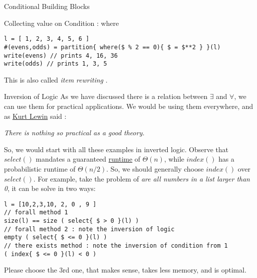 \begin{section}{Conditional Building Blocks}
\begin{subsection}{Collecting value on Condition : where }
\begin{center}\begin{minipage}{\linewidth}
\begin{lstlisting}[style=JexlStyle]
l = [ 1, 2, 3, 4, 5, 6 ]
#(evens,odds) = partition{ where($ % 2 == 0){ $ = $**2 } }(l)
write(evens) // prints 4, 16, 36 
write(odds) // prints 1, 3, 5
\end{lstlisting}\end{minipage}
\end{center}

This is also called \emph{item rewriting} .
\end{subsection}

\begin{subsection}{Inversion of Logic}
As we have discussed there is a relation between $\exists$ and $\forall$, 
we can use them for practical applications. We would be using them everywhere, 
and as \href{http://psychology.about.com/od/psychologyquotes/a/lewinquotes.htm}{Kurt Lewin} said :
\begin{center}
\emph{There is nothing so practical as a good theory.}
\end{center}
So, we would start with all these examples in inverted logic.
Observe that $select()$ mandates a guaranteed \href{https://en.wikipedia.org/wiki/Big_O_notation}{runtime} of $\Theta(n)$,
while $index()$ has a probabilistic runtime of $\Theta(n/2)$. So, we should generally choose $index()$ over $select()$.
For example, take the problem of \emph{are all numbers in a list larger than 0}, it can be solve in two ways:

\begin{center}\begin{minipage}{\linewidth}
\begin{lstlisting}[style=JexlStyle]
l = [10,2,3,10, 2, 0 , 9 ]
// forall method 1
size(l) == size ( select{ $ > 0 }(l) )    
// forall method 2 : note the inversion of logic 
empty ( select{ $ <= 0 }(l) )    
// there exists method : note the inversion of condition from 1
( index{ $ <= 0 }(l) < 0 )
\end{lstlisting}\end{minipage}
\end{center}

Please choose the 3rd one, that makes sense, takes less memory, and is optimal.    
\end{subsection}

\end{section}


